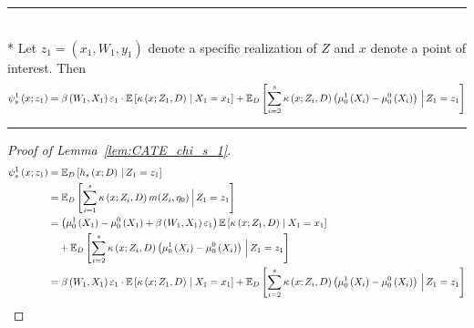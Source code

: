 \hrule

\begin{lem}\label{lem:CATE_chi_s_1}\mbox{}\\*
	Let $z_1 = (x_1, W_{1}, y_1)$ denote a specific realization of $Z$ and $x$ denote a point of interest.
	Then
	\begin{equation}
		\psi_{s}^{1}\left(x; z_1\right)
		= \beta\left(W_{1}, X_1\right)\varepsilon_{1} \cdot \mathbb{E}\left[\kappa\left(x; Z_1, D\right) \; \middle| \; X_1 = x_1\right]
		+ \mathbb{E}_{D}\left[\sum_{i = 2}^{s} \kappa\left(x; Z_{i}, D\right) \left(\mu_{0}^{1}\left(X_{i}\right) - \mu_{0}^{0}\left(X_{i}\right)\right)
		\, \Big| \, Z_1 = z_1 \right]
	\end{equation}
\end{lem}
\hrule
\begin{proof}[Proof of Lemma~\ref{lem:CATE_chi_s_1}]
	\begin{equation}
		\begin{aligned}
			\psi_{s}^{1}\left(x; z_1\right)
			 & = \mathbb{E}_{D}\left[h_{s}\left(x; D\right) \, | \, Z_1 = z_1 \right] \\
			 & = \mathbb{E}_{D}\left[\sum_{i = 1}^{s} \kappa\left(x; Z_{i}, D\right) m(Z_i, \eta_0)
			 \, \Big| \, Z_1 = z_1 \right]\\
			 & = \left(\mu_{0}^{1}\left(X_1\right) - \mu_{0}^{0}\left(X_1\right) + \beta\left(W_{1}, X_1\right)\varepsilon_{1}\right)\mathbb{E}\left[\kappa\left(x; Z_1, D\right) \; \middle| \; X_1 = x_1\right]\\
			 & \quad + \mathbb{E}_{D}\left[\sum_{i = 2}^{s} \kappa\left(x; Z_{i}, D\right) \left(\mu_{0}^{1}\left(X_{i}\right) - \mu_{0}^{0}\left(X_{i}\right)\right)
			 \, \Big| \, Z_1 = z_1 \right]\\
			 & = \beta\left(W_{1}, X_1\right)\varepsilon_{1} \cdot \mathbb{E}\left[\kappa\left(x; Z_1, D\right) \; \middle| \; X_1 = x_1\right]
			 + \mathbb{E}_{D}\left[\sum_{i = 2}^{s} \kappa\left(x; Z_{i}, D\right) \left(\mu_{0}^{1}\left(X_{i}\right) - \mu_{0}^{0}\left(X_{i}\right)\right)
			 \, \Big| \, Z_1 = z_1 \right]
		\end{aligned}
	\end{equation}
\end{proof}


